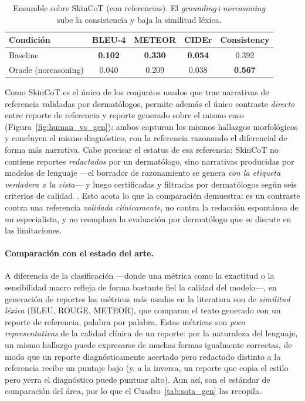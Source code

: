 \documentclass[11pt, a4paper]{article}
\begin{document}
\begin{table}[H]
  \centering
  \caption{Ensamble sobre SkinCoT (con referencias). El \emph{grounding}+\emph{noreasoning} sube la
  consistencia y baja la similitud léxica.}
  \label{tab:ensamble_skincot}
  \begin{tabular}{lcccc}
    \toprule
    \textbf{Condición} & \textbf{BLEU-4} & \textbf{METEOR} & \textbf{CIDEr} & \textbf{Consistency} \\
    \midrule
    Baseline             & \textbf{0.102} & \textbf{0.330} & \textbf{0.054} & 0.392 \\
    Oracle (noreasoning) & 0.040 & 0.209 & 0.038 & \textbf{0.567} \\
    \bottomrule
  \end{tabular}
\end{table}

Como SkinCoT es el único de los conjuntos usados que trae narrativas de referencia validadas por
dermatólogos, permite además el único contraste \emph{directo} entre reporte de referencia y reporte
generado sobre el mismo caso (Figura~\ref{fig:human_vs_gen}): ambos capturan los mismos hallazgos
morfológicos y concluyen el mismo diagnóstico, con la referencia razonando el diferencial de forma más
narrativa. Cabe precisar el estatus de esa referencia: SkinCoT no contiene reportes \emph{redactados} por
un dermatólogo, sino narrativas producidas por modelos de lenguaje —el borrador de razonamiento se genera
\emph{con la etiqueta verdadera a la vista}— y luego certificadas y filtradas por dermatólogos según seis
criterios de calidad~\cite{shen2025skincare}. Esto acota lo que la comparación demuestra: es un contraste
contra una referencia \emph{validada clínicamente}, no contra la redacción espontánea de un especialista,
y no reemplaza la evaluación por dermatólogo que se discute en las limitaciones.

\paragraph{Comparación con el estado del arte.} A diferencia de la clasificación —donde una métrica
como la exactitud o la sensibilidad macro refleja de forma bastante fiel la calidad del modelo—, en
generación de reportes las métricas más usadas en la literatura son de \emph{similitud léxica} (BLEU,
ROUGE, METEOR), que comparan el texto generado con un reporte de referencia, palabra por palabra. Estas
métricas son \emph{poco representativas} de la calidad clínica de un reporte: por la naturaleza del
lenguaje, un mismo hallazgo puede expresarse de muchas formas igualmente correctas, de modo que un
reporte diagnósticamente acertado pero redactado distinto a la referencia recibe un puntaje bajo (y, a la
inversa, un reporte que copia el estilo pero yerra el diagnóstico puede puntuar alto). Aun así, son el
estándar de comparación del área, por lo que el Cuadro~\ref{tab:sota_gen} las recopila.
\end{document}
